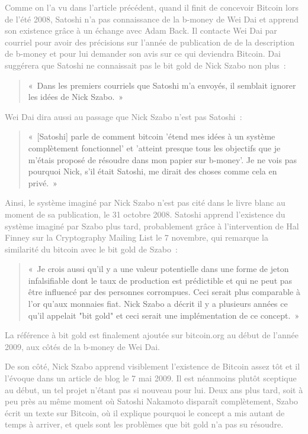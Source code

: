 \textcolor{gray}{Comme on l'a vu dans l'article précédent, quand il finit de concevoir Bitcoin lors de l'été 2008, Satoshi n'a pas connaissance de la b-money de Wei Dai et apprend son existence grâce à un échange avec Adam Back. Il contacte Wei Dai par courriel pour avoir des précisions sur l'année de publication de de la description de b-money et pour lui demander son avis sur ce qui deviendra Bitcoin. Dai suggérera que Satoshi ne connaissait pas le bit gold de Nick Szabo non plus~:}

\begin{quote}
«~Dans les premiers courriels que Satoshi m'a envoyés, il semblait ignorer les idées de Nick Szabo.~»
\end{quote}

\textcolor{gray}{Wei Dai dira aussi au passage que Nick Szabo n'est pas Satoshi~:}

\begin{quote}
«~[Satoshi] parle de comment bitcoin 'étend mes idées à un système complètement fonctionnel' et 'atteint presque tous les objectifs que je m'étais proposé de résoudre dans mon papier sur b-money'. Je ne vois pas pourquoi Nick, s'il était Satoshi, me dirait des choses comme cela en privé.~»
\end{quote}

\textcolor{gray}{Ainsi, le système imaginé par Nick Szabo n'est pas cité dans le livre blanc au moment de sa publication, le 31 octobre 2008. Satoshi apprend l'existence du système imaginé par Szabo plus tard, probablement grâce à l'intervention de Hal Finney sur la Cryptography Mailing List le 7 novembre, qui remarque la similarité du bitcoin avec le bit gold de Szabo~:}

\begin{quote}
«~Je crois aussi qu'il y a une valeur potentielle dans une forme de jeton infalsifiable dont le taux de production est prédictible et qui ne peut pas être influencé par des personnes corrompues. Ceci serait plus comparable à l'or qu'aux monnaies fiat. Nick Szabo a décrit il y a plusieurs années ce qu'il appelait "bit gold" et ceci serait une implémentation de ce concept.~»
\end{quote}

\textcolor{gray}{La référence à bit gold est finalement ajoutée sur bitcoin.org au début de l'année 2009, aux côtés de la b-money de Wei Dai.}

\textcolor{gray}{De son côté, Nick Szabo apprend visiblement l'existence de Bitcoin assez tôt et il l'évoque dans un article de blog le 7 mai 2009. Il est néanmoins plutôt sceptique au début, un tel projet n'étant pas si nouveau pour lui. Deux ans plus tard, soit à peu près au même moment où Satoshi Nakamoto disparaît complètement, Szabo écrit un texte sur Bitcoin, où il explique pourquoi le concept a mis autant de temps à arriver, et quels sont les problèmes que bit gold n'a pas su résoudre.}


